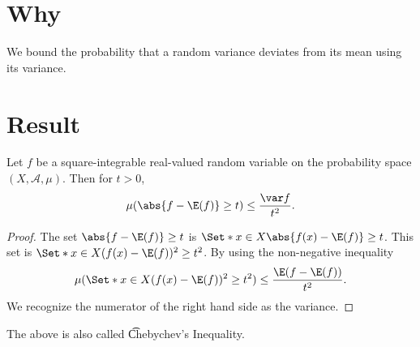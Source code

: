 

\section*{Why}

We bound the probability
that a random variance
deviates from its mean
using its variance.

\section*{Result}

\begin{proposition}
Let $f$ be a
square-integrable
real-valued
random variable
on the probability
space $(X, \mathcal{A} , \mu )$.
Then for $t > 0$,
  \[
\mu (\abs{f - \E (f)} \geq t) \leq \frac{\var f}{t^2}.
  \]
\begin{proof}The set
$\abs{f - \E (f)} \geq t$
is
$\Set*{x \in X}{ \abs{f(x) - \E (f)} \geq t}$.
This set is
$\Set*{x \in X}{({f(x) - \E (f)})^2 \geq t^2}$.
By using the non-negative inequality
  \[
\mu (\Set*{x \in X}{({f(x) - \E (f)})^2 \geq t^2}) \leq \frac{\E (f - \E (f))}{t^2}.
  \]
We recognize the numerator of the right
hand side as the variance.\end{proof}\end{proposition}
The above is also called \t{Chebychev's Inequality}.

\blankpage
